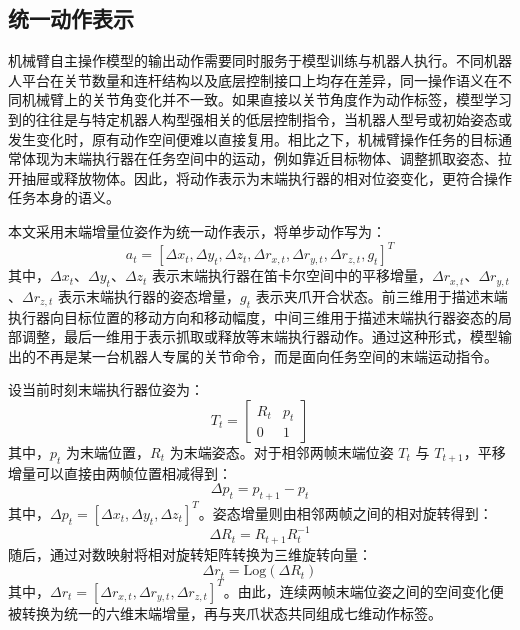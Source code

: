 \subsection{统一动作表示}
\label{subsec:unified_action_representation}

机械臂自主操作模型的输出动作需要同时服务于模型训练与机器人执行。不同机器人平台在关节数量和连杆结构以及底层控制接口上均存在差异，同一操作语义在不同机械臂上的关节角变化并不一致。如果直接以关节角度作为动作标签，模型学习到的往往是与特定机器人构型强相关的低层控制指令，当机器人型号或初始姿态或发生变化时，原有动作空间便难以直接复用。相比之下，机械臂操作任务的目标通常体现为末端执行器在任务空间中的运动，例如靠近目标物体、调整抓取姿态、拉开抽屉或释放物体。因此，将动作表示为末端执行器的相对位姿变化，更符合操作任务本身的语义。

本文采用末端增量位姿作为统一动作表示，将单步动作写为：
\begin{equation}
  \label{eq:unified_action_vector}
  a_t = [\Delta x_t, \Delta y_t, \Delta z_t, \Delta r_{x,t}, \Delta r_{y,t}, \Delta r_{z,t}, g_t]^T
\end{equation}
其中，$\Delta x_t$、$\Delta y_t$、$\Delta z_t$ 表示末端执行器在笛卡尔空间中的平移增量，$\Delta r_{x,t}$、$\Delta r_{y,t}$、$\Delta r_{z,t}$ 表示末端执行器的姿态增量，$g_t$ 表示夹爪开合状态。前三维用于描述末端执行器向目标位置的移动方向和移动幅度，中间三维用于描述末端执行器姿态的局部调整，最后一维用于表示抓取或释放等末端执行器动作。通过这种形式，模型输出的不再是某一台机器人专属的关节命令，而是面向任务空间的末端运动指令。

设当前时刻末端执行器位姿为：
\begin{equation}
  \label{eq:ee_pose_matrix}
  T_t =
  \begin{bmatrix}
    R_t & p_t \\
    0 & 1
  \end{bmatrix}
\end{equation}
其中，$p_t$ 为末端位置，$R_t$ 为末端姿态。对于相邻两帧末端位姿 $T_t$ 与 $T_{t+1}$，平移增量可以直接由两帧位置相减得到：
\begin{equation}
  \label{eq:delta_position}
  \Delta p_t = p_{t+1} - p_t
\end{equation}
其中，$\Delta p_t = [\Delta x_t, \Delta y_t, \Delta z_t]^T$。姿态增量则由相邻两帧之间的相对旋转得到：
\begin{equation}
  \label{eq:delta_rotation_matrix}
  \Delta R_t = R_{t+1} R_t^{-1}
\end{equation}
随后，通过对数映射将相对旋转矩阵转换为三维旋转向量：
\begin{equation}
  \label{eq:delta_rotation_vector}
  \Delta r_t = \mathrm{Log}(\Delta R_t)
\end{equation}
其中，$\Delta r_t = [\Delta r_{x,t}, \Delta r_{y,t}, \Delta r_{z,t}]^T$。由此，连续两帧末端位姿之间的空间变化便被转换为统一的六维末端增量，再与夹爪状态共同组成七维动作标签。

